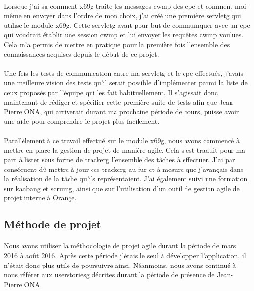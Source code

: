 \documentclass[12pt,a4paper]{report}
\begin{document}
\paragraph*{}Lorsque j’ai su comment \gls{x69g} traite les messages \gls{cwmp} des \gls{cpe} et comment moi-même en envoyer dans l’ordre de mon choix, j’ai créé une première \gls{servletg} qui utilise le module \gls{x69g}. Cette \gls{servletg} avait pour but de communiquer avec un \gls{cpe} qui voudrait établir une session \gls{cwmp} et lui envoyer les requêtes \gls{cwmp} voulues. Cela m’a permis de mettre en pratique pour la première fois l’ensemble des connaissances acquises depuis le début de ce projet.
\paragraph*{}Une fois les tests de communication entre ma \gls{servletg} et le \gls{cpe} effectués, j’avais une meilleure vision des tests qu’il serait possible d’implémenter parmi la liste de ceux proposés par l’équipe qui les fait habituellement. Il s’agissait donc maintenant de rédiger et spécifier cette première suite de tests afin que Jean Pierre ONA, qui arriverait durant ma prochaine période de cours, puisse avoir une aide pour comprendre le projet plus facilement.
\paragraph*{}Parallèlement à ce travail effectué sur le module \gls{x69g}, nous avons
commencé à mettre en place la gestion de projet de manière agile. Cela s’est traduit pour ma part à lister sous forme de \gls{trackerg} l’ensemble des tâches à effectuer. J’ai par conséquent dû mettre à jour ces \gls{trackerg} au fur et à mesure que j’avançais dans la réalisation de la tâche qu’ils représentaient. J’ai également suivi une formation sur \gls{kanbang} et \gls{scrumg}, ainsi que sur l’utilisation d’un outil de gestion agile de projet interne à Orange. \\

\subsection{Méthode de projet}
\paragraph*{}Nous avons utiliser la méthodologie de projet agile durant la période de mars 2016 à août 2016. Après cette période j'étais le seul à développer l'application, il n'était donc plus utile de poursuivre ainsi. Néanmoins, nous avons continué à nous référer aux \gls{userstoriesg} décrites durant la période de présence de Jean-Pierre ONA. 
\end{document}
